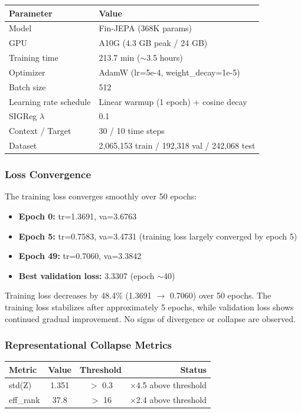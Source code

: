 \documentclass[11pt]{article}
\begin{document}
\begin{center}
\begin{tabular}{ll}
\toprule
Parameter & Value \\
\midrule
Model & Fin-JEPA (368K params) \\
GPU & A10G (4.3 GB peak / 24 GB) \\
Training time & 213.7 min ($\sim$3.5 hours) \\
Optimizer & AdamW (lr=5e-4, weight\_decay=1e-5) \\
Batch size & 512 \\
Learning rate schedule & Linear warmup (1 epoch) + cosine decay \\
SIGReg $\lambda$ & 0.1 \\
Context / Target & 30 / 10 time steps \\
Dataset & 2,065,153 train / 192,318 val / 242,068 test \\
\bottomrule
\end{tabular}
\end{center}

\subsubsection{Loss Convergence}

The training loss converges smoothly over 50 epochs:

\begin{itemize}[nosep]
  \item \textbf{Epoch 0:} tr=1.3691, va=3.6763
  \item \textbf{Epoch 5:} tr=0.7583, va=3.4731 (training loss largely converged by epoch 5)
  \item \textbf{Epoch 49:} tr=0.7060, va=3.3842
  \item \textbf{Best validation loss:} 3.3307 (epoch $\sim$40)
\end{itemize}

Training loss decreases by 48.4\% (1.3691 $\rightarrow$ 0.7060) over 50 epochs. The training loss stabilizes after approximately 5 epochs, while validation loss shows continued gradual improvement. No signs of divergence or collapse are observed.

\subsubsection{Representational Collapse Metrics}

\begin{center}
\begin{tabular}{lccr}
\toprule
Metric & Value & Threshold & Status \\
\midrule
std(Z)    & 1.351 & $>$ 0.3 & $\times$4.5 above threshold \\
eff\_rank & 37.8  & $>$ 16  & $\times$2.4 above threshold \\
\bottomrule
\end{tabular}
\end{center}
\end{document}
